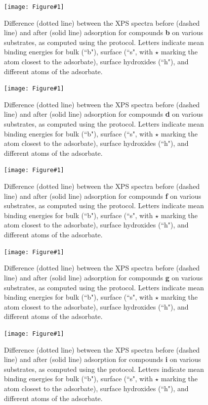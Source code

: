 \documentclass[journal=jpccck,manuscript=article]{achemso}
\begin{document}
\newcommand{\XPSsa}[2]{
\begin{figure}[!h]
	\centering
	\texttt{[image: Figure\#1]}
	\caption{Difference (dotted line) between the XPS spectra before (dashed line) and after (solid line) adsorption for compounds \textbf{#2} on various substrates, as computed using the \cp{E_\infty} protocol. Letters indicate mean binding energies for bulk (``b"), surface (``s", with $\star$ marking the atom closest to the adsorbate), surface hydroxides (``h"), and different atoms of the adsorbate.}
	\label{fig:spectraXPSads#2}
\end{figure}
}

\XPSsa{S5}{b}
\XPSsa{S6}{d}
\XPSsa{S7}{f}
\XPSsa{S8}{g}
\XPSsa{S9}{i}

\clearpage

	
\end{document}
